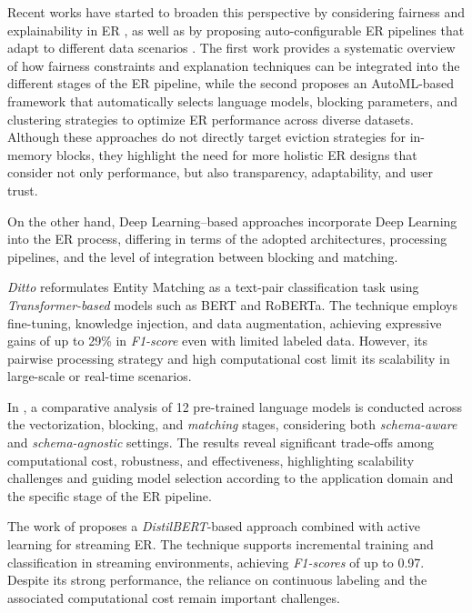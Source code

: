 \documentclass{ieeeaccess}
\begin{document}
Recent works have started to broaden this perspective by considering fairness and explainability in ER \cite{11129015}, as well as by proposing auto-configurable ER pipelines that adapt to different data scenarios \cite{11129641}. The first work provides a systematic overview of how fairness constraints and explanation techniques can be integrated into the different stages of the ER pipeline, while the second proposes an AutoML-based framework that automatically selects language models, blocking parameters, and clustering strategies to optimize ER performance across diverse datasets. Although these approaches do not directly target eviction strategies for in-memory blocks, they highlight the need for more holistic ER designs that consider not only performance, but also transparency, adaptability, and user trust.

On the other hand, Deep Learning–based approaches \cite{kasai2019lrder, dev2022DeepLI, Li_2020, zeakis2023pretrainedembeddingsentityresolution} incorporate Deep Learning into the ER process, differing in terms of the adopted architectures, processing pipelines, and the level of integration between blocking and matching.

\textit{Ditto} \cite{Li_2020} reformulates Entity Matching as a text-pair classification task using \textit{Transformer-based} models such as BERT and RoBERTa. The technique employs fine-tuning, knowledge injection, and data augmentation, achieving expressive gains of up to 29\% in \textit{F1-score} even with limited labeled data. However, its pairwise processing strategy and high computational cost limit its scalability in large-scale or real-time scenarios.

In \cite{zeakis2023pretrainedembeddingsentityresolution}, a comparative analysis of 12 pre-trained language models is conducted across the vectorization, blocking, and \textit{matching} stages, considering both \textit{schema-aware} and \textit{schema-agnostic} settings. The results reveal significant trade-offs among computational cost, robustness, and effectiveness, highlighting scalability challenges and guiding model selection according to the application domain and the specific stage of the ER pipeline.

The work of \cite{dev2022DeepLI} proposes a \textit{DistilBERT}-based approach combined with active learning for streaming ER. The technique supports incremental training and classification in streaming environments, achieving \textit{F1-scores} of up to 0.97. Despite its strong performance, the reliance on continuous labeling and the associated computational cost remain important challenges.
\end{document}
